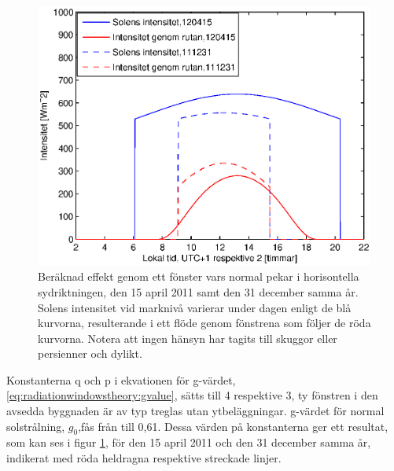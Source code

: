 \begin{figure}[hpbt]
\centering
\includegraphics[scale=0.7]{images/effekt0415and1231.eps}
\caption{\label{fig:effekt0415and1231} Beräknad effekt genom ett fönster vars normal pekar i horisontella sydriktningen, den 15 april 2011 samt den 31 december samma år. Solens intensitet vid marknivå varierar under dagen enligt de blå kurvorna, resulterande i ett flöde genom fönstrena som följer de röda kurvorna. Notera att ingen hänsyn har tagits till skuggor eller persienner och dylikt.}
\end{figure}

Konstanterna q och p i ekvationen för g-värdet, \ref{eq:radiationwindowstheory:gvalue}, sätts till 4 respektive 3, ty fönstren i den avsedda byggnaden är av typ treglas utan ytbeläggningar. g-värdet för normal solstrålning, $g_0$,fås från \cite{ASHRAE09} till 0,61. Dessa värden på konstanterna ger ett resultat, som kan ses i figur \ref{fig:effekt0415and1231}, för den 15 april 2011 och den 31 december samma år, indikerat med röda heldragna respektive streckade linjer.
